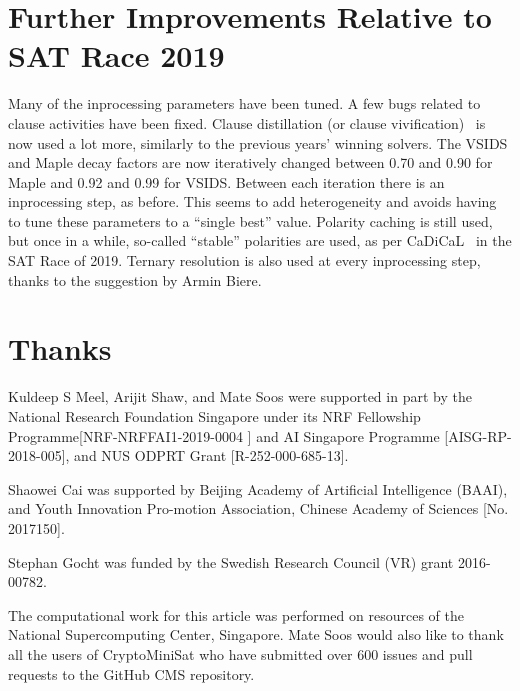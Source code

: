\documentclass[final]{ieee}
\begin{document}
\section{Further Improvements Relative to SAT Race 2019}
Many of the inprocessing parameters have been tuned. A few bugs related to clause activities have been fixed. Clause distillation (or clause vivification)~\cite{DBLP:journals/ai/LiXLMLL20} is now used a lot more, similarly to the previous years' winning solvers. The VSIDS and Maple decay factors are now iteratively changed between 0.70 and 0.90 for Maple and 0.92 and 0.99 for VSIDS. Between each iteration there is an inprocessing step, as before. This seems to add heterogeneity and avoids having to tune these parameters to a ``single best'' value. Polarity caching is still used, but once in a while, so-called ``stable'' polarities are used, as per CaDiCaL~\cite{cadical} in the SAT Race of 2019. Ternary resolution is also used at every inprocessing step, thanks to the suggestion by Armin Biere.


\section{Thanks}
Kuldeep S Meel, Arijit Shaw, and Mate Soos were supported in part by the National Research Foundation Singapore under its NRF Fellowship Programme[NRF-NRFFAI1-2019-0004 ] and AI Singapore Programme [AISG-RP-2018-005],  and NUS ODPRT Grant [R-252-000-685-13].

Shaowei Cai was supported  by Beijing Academy of Artificial Intelligence (BAAI), and Youth Innovation Pro-motion Association, Chinese Academy of Sciences [No. 2017150].

Stephan Gocht was funded by the Swedish Research Council (VR) grant \mbox{2016-00782}.

The computational work for this article was performed on resources of the National Supercomputing Center, Singapore\cite{nscc}. Mate Soos would also like to thank all the users of CryptoMiniSat who have submitted over 600 issues and pull requests to the GitHub CMS repository\cite{CMS}.




\vfill
\pagebreak
\end{document}
